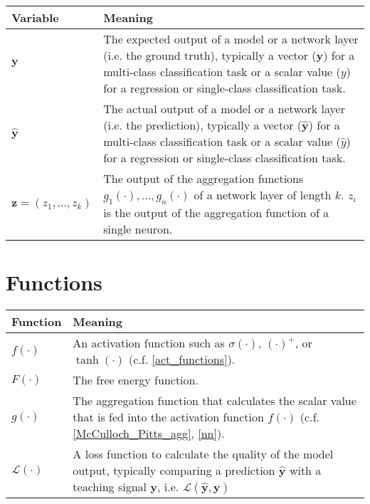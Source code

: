  \begin{tabular}{ p{3cm} p{11cm} }
	\textbf{Variable} & \textbf{Meaning}\\
	\hline
     $\boldsymbol{y}$ & The expected output of a model or a network layer (i.e. the ground truth), typically a vector ($\boldsymbol{y}$) for a multi-class classification task or a scalar value ($y$) for a regression or single-class classification task.\\
 	$\boldsymbol{\hat{y}}$ & The actual output of a model or a network layer (i.e. the prediction), typically a vector ($\boldsymbol{\hat{y}}$) for a multi-class classification task or a scalar value ($\hat{y}$) for a regression or single-class classification task.\\
	$\boldsymbol{z} = (z_1, ..., z_k)$ & The output of the aggregation functions $g_1(\cdot), ..., g_n(\cdot)$ of a network layer of length $k$. $z_i$  is the output of the aggregation function of a single neuron.\\
\end{tabular}


\section{Functions}

\begin{tabular}{ p{3cm} p{11cm} }
	\textbf{Function} & \textbf{Meaning}\\
	\hline
	$f(\cdot)$ & An activation function such as $\sigma(\cdot)$, $(\cdot)^{+}$, or $\tanh(\cdot)$ (c.f. \eqref{act_functions}).\\
    $F(\cdot)$ & The free energy function.\\
	$g(\cdot)$ & The aggregation function that calculates the scalar value that is fed into the activation function $f(\cdot)$ (c.f. \eqref{McCulloch_Pitts_agg},  \eqref{nn}).\\
    $\mathcal{L}(\cdot)$ & A loss function to calculate the quality of the model output, typically comparing a prediction $\boldsymbol{\hat{y}}$ with a teaching signal $\boldsymbol{y}$, i.e. $\mathcal{L}(\boldsymbol{\hat{y}}, \boldsymbol{y})$\\
\end{tabular}
\renewcommand{\arraystretch}{1}







